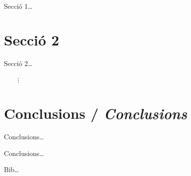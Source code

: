 \documentclass[12pt]{article}
\begin{document}
Secció 1\ldots


\section{Secció 2}

Secció 2\ldots

\mbox{}\par$\qquad{\vdots}$

\addtocounter{section}{96} %

\section{Conclusions / \emph{Conclusions}}

Conclusions\ldots

\vspace{\baselineskip}

\begin{otherlanguage}{english}\itshape

\noindent Conclusions\ldots

\end{otherlanguage}


\begin{thebibliography}{99}

Bib\ldots

\end{thebibliography}
\end{document}

